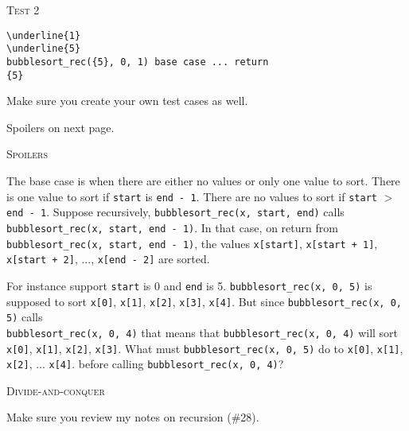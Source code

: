 \textsc{Test 2}
\begin{Verbatim}[commandchars=\\\{\}, fontsize=\small, frame=single]
\underline{1}
\underline{5}
bubblesort_rec({5}, 0, 1) base case ... return
{5}
\end{Verbatim}

Make sure you create your own test cases as well.

Spoilers on next page.

\newpage
\textsc{Spoilers}

The base case is when there are either no values or only one value
to sort.
There is one value to sort if \verb!start! is \verb!end - 1!.
There are no values to sort if \verb!start! $>$ \verb!end - 1!.
Suppose recursively, \verb!bubblesort_rec(x, start, end)! calls
\\
\verb!bubblesort_rec(x, start, end - 1)!.
In that case, on return from
\\
\verb!bubblesort_rec(x, start, end - 1)!,
the values
\verb!x[start]!,
\verb!x[start + 1]!,
\verb!x[start + 2]!, ..., 
\verb!x[end - 2]!
are sorted.

For instance support \verb!start! is 0 and \verb!end! is 5.
\verb!bubblesort_rec(x, 0, 5)! is supposed to sort
\verb!x[0]!,
\verb!x[1]!,
\verb!x[2]!, 
\verb!x[3]!, 
\verb!x[4]!.
But since
\verb!bubblesort_rec(x, 0, 5)!
calls
\\
\verb!bubblesort_rec(x, 0, 4)!
that means that
\verb!bubblesort_rec(x, 0, 4)!
will sort
\verb!x[0]!,
\verb!x[1]!,
\verb!x[2]!,
\verb!x[3]!.
What must
\verb!bubblesort_rec(x, 0, 5)! do to 
\verb!x[0]!,
\verb!x[1]!,
\verb!x[2]!, ...
\verb!x[4]!.
before calling
\verb!bubblesort_rec(x, 0, 4)!?

\newpage
\textsc{Divide-and-conquer}

Make sure you review my notes on recursion (\#28).

